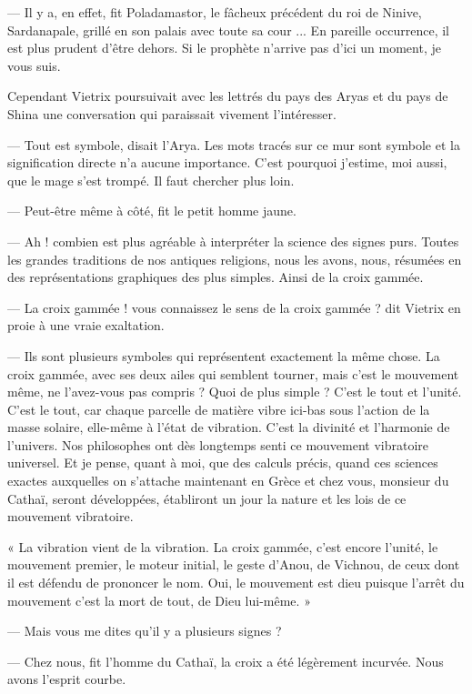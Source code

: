 \documentclass[a4paper, 11pt, oneside, polutonikogreek, french]{article}
\begin{document}
--- Il y a, en effet, fit Poladamastor, le fâcheux précédent du roi de Ninive, Sardanapale, grillé en son palais avec toute sa cour ... En pareille occurrence, il est plus prudent d'être dehors. Si le prophète n'arrive pas d'ici un moment, je vous suis.

Cependant Vietrix poursuivait avec les lettrés du pays des Aryas et du pays de Shina une conversation qui paraissait vivement l'intéresser.

--- Tout est symbole, disait l'Arya. Les mots tracés sur ce mur sont symbole et la signification directe n'a aucune importance. C'est pourquoi j'estime, moi aussi, que le mage s'est trompé. Il faut chercher plus loin.

--- Peut-être même à côté, fit le petit homme jaune.

--- Ah ! combien est plus agréable à interpréter la science des signes purs. Toutes les grandes traditions de nos antiques religions, nous les avons, nous, résumées en des représentations graphiques des plus simples. Ainsi de la croix gammée.

--- La croix gammée ! vous connaissez le sens de la croix gammée ? dit Vietrix en proie à une vraie exaltation.

--- Ils sont plusieurs symboles qui représentent exactement la même chose. La croix gammée, avec ses deux ailes qui semblent tourner, mais c'est le mouvement même, ne l'avez-vous pas compris ? Quoi de plus simple ? C'est le tout et l'unité. C'est le tout, car chaque parcelle de matière vibre ici-bas sous l'action de la masse solaire, elle-même à l'état de vibration. C'est la divinité et l'harmonie de l'univers. Nos philosophes ont dès longtemps senti ce mouvement vibratoire universel. Et je pense, quant à moi, que des calculs précis, quand ces sciences exactes auxquelles on s'attache maintenant en Grèce et chez vous, monsieur du Cathaï, seront développées, établiront un jour la nature et les lois de ce mouvement vibratoire.

« La vibration vient de la vibration. La croix gammée, c'est encore l'unité, le mouvement premier, le moteur initial, le geste d'Anou, de Vichnou, de ceux dont il est défendu de prononcer le nom. Oui, le mouvement est dieu puisque l'arrêt du mouvement c'est la mort de tout, de Dieu lui-même. »

--- Mais vous me dites qu'il y a plusieurs signes ?

--- Chez nous, fit l'homme du Cathaï, la croix a été légèrement incurvée. Nous avons l'esprit courbe.
\end{document}
